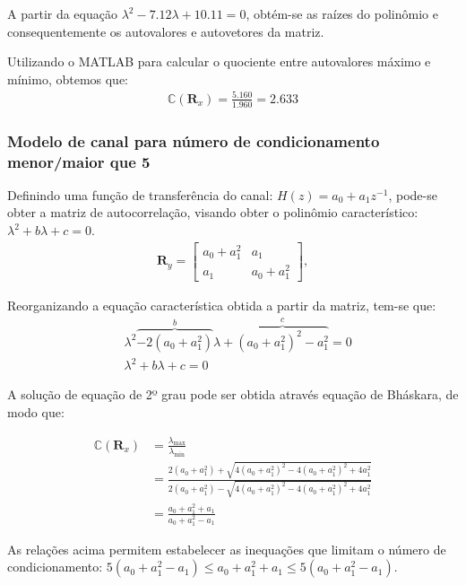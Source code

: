A partir da equação $\lambda^{2} - 7.12 \lambda + 10.11 = 0$, obtém-se as raízes do polinômio e consequentemente os autovalores e autovetores da matriz.

Utilizando o MATLAB para calcular o quociente entre autovalores máximo e mínimo, obtemos que:
\begin{align*}
    \mathbb{C} (\mathbf{R}_{x}) = \frac{5.160}{1.960} = 2.633
\end{align*}

\subsubsection*{Modelo de canal para número de condicionamento menor/maior que 5}

Definindo uma função de transferência do canal: $H(z) = a_{0} + a_{1}z^{-1}$, pode-se obter a matriz de autocorrelação, visando obter o polinômio característico: $\lambda^{2} + b \lambda + c = 0$.
\begin{align*}
    \mathbf{R}_{y} =
    \begin{bmatrix}
        a_{0} + a^{2}_{1} & a_{1}\\
        a_{1} & a_{0} + a^{2}_{1}
    \end{bmatrix},
\end{align*}

Reorganizando a equação característica obtida a partir da matriz, tem-se que:
\begin{align*}
    &\lambda^{2} \overbrace{- 2 (a_{0} + a^{2}_{1})}^{b} \lambda + \overbrace{(a_{0} + a^{2}_{1})^{2} - a^{2}_{1}}^{c} = 0 \\
    &\lambda^{2} + b \lambda + c = 0
\end{align*}

A solução de equação de 2º grau pode ser obtida através equação de Bháskara, de modo que:

\begin{align*}
    \mathbb{C} (\mathbf{R}_{x}) &= \frac{\lambda_{\text{max}}}{\lambda_{\text{min}}} \\
     &= \frac{2 (a_{0} + a^{2}_{1}) + \sqrt{4 (a_{0} + a^{2}_{1})^{2} - 4 (a_{0} + a^{2}_{1})^{2} + 4 a^{2}_{1}}}{2 (a_{0} + a^{2}_{1}) - \sqrt{4 (a_{0} + a^{2}_{1})^{2} - 4 (a_{0} + a^{2}_{1})^{2} + 4 a^{2}_{1}}} \\
     &= \frac{a_{0} + a^{2}_{1} + a_{1}}{a_{0} + a^{2}_{1} - a_{1}}
\end{align*}

As relações acima permitem estabelecer as inequações que limitam o número de condicionamento: $ 5 (a_{0} + a^{2}_{1} - a_{1}) \leq a_{0} + a^{2}_{1} + a_{1} \leq 5 (a_{0} + a^{2}_{1} - a_{1})$.

